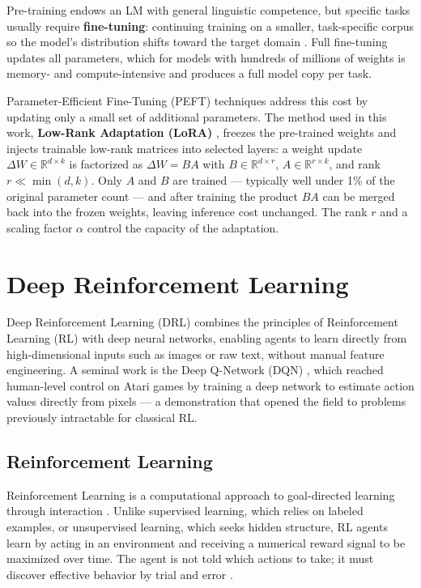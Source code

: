 Pre-training endows an LM with general linguistic competence, but specific tasks usually require \textbf{fine-tuning}: continuing training on a smaller, task-specific corpus so the model's distribution shifts toward the target domain \cite{jm3_llm_book}. Full fine-tuning updates all parameters, which for models with hundreds of millions of weights is memory- and compute-intensive and produces a full model copy per task.

Parameter-Efficient Fine-Tuning (PEFT) techniques address this cost by updating only a small set of additional parameters. The method used in this work, \textbf{Low-Rank Adaptation (LoRA)} \cite{hu2021lora}, freezes the pre-trained weights and injects trainable low-rank matrices into selected layers: a weight update $\Delta W \in \mathbb{R}^{d \times k}$ is factorized as $\Delta W = BA$ with $B \in \mathbb{R}^{d \times r}$, $A \in \mathbb{R}^{r \times k}$, and rank $r \ll \min(d, k)$. Only $A$ and $B$ are trained --- typically well under 1\% of the original parameter count --- and after training the product $BA$ can be merged back into the frozen weights, leaving inference cost unchanged. The rank $r$ and a scaling factor $\alpha$ control the capacity of the adaptation.

\section{Deep Reinforcement Learning}

Deep Reinforcement Learning (DRL) combines the principles of Reinforcement Learning (RL) with deep neural networks, enabling agents to learn directly from high-dimensional inputs such as images or raw text, without manual feature engineering. A seminal work is the Deep Q-Network (DQN) \cite{Mnih2015HumanlevelCT}, which reached human-level control on Atari games by training a deep network to estimate action values directly from pixels --- a demonstration that opened the field to problems previously intractable for classical RL.

\subsection{Reinforcement Learning}

Reinforcement Learning is a computational approach to goal-directed learning through interaction \cite{Sutton2018ReinforcementL}. Unlike supervised learning, which relies on labeled examples, or unsupervised learning, which seeks hidden structure, RL agents learn by acting in an environment and receiving a numerical reward signal to be maximized over time. The agent is not told which actions to take; it must discover effective behavior by trial and error \cite{Sutton2018ReinforcementL}.

